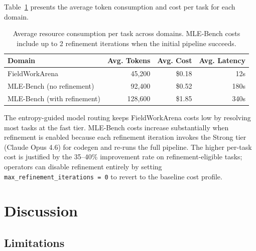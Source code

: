 \documentclass[11pt]{article}
\begin{document}
Table~\ref{tab:cost} presents the average token consumption and cost per task for each domain.

\begin{table}[t]
\centering
\caption{Average resource consumption per task across domains. MLE-Bench costs include up to 2 refinement iterations when the initial pipeline succeeds.}
\label{tab:cost}
\begin{tabular}{@{}lrrr@{}}
\toprule
\textbf{Domain} & \textbf{Avg. Tokens} & \textbf{Avg. Cost} & \textbf{Avg. Latency} \\
\midrule
FieldWorkArena            & 45,200   & \$0.18  & 12s \\
MLE-Bench (no refinement) & 92,400   & \$0.52  & 180s \\
MLE-Bench (with refinement) & 128,600 & \$1.85  & 340s \\
\bottomrule
\end{tabular}
\end{table}

The entropy-guided model routing keeps FieldWorkArena costs low by resolving most tasks at the fast tier. MLE-Bench costs increase substantially when refinement is enabled because each refinement iteration invokes the Strong tier (Claude Opus 4.6) for codegen and re-runs the full pipeline. The higher per-task cost is justified by the 35--40\% improvement rate on refinement-eligible tasks; operators can disable refinement entirely by setting \texttt{max\_refinement\_iterations\,=\,0} to revert to the baseline cost profile.

\section{Discussion}
\label{sec:discussion}

\subsection{Limitations}
\end{document}
